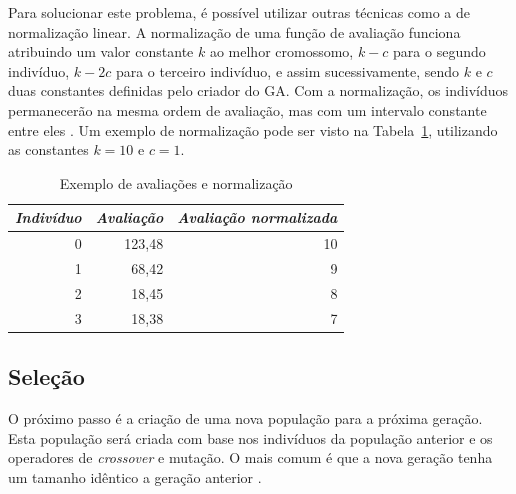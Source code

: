 \documentclass[12pt,oneside,a4paper,english,french,spanish,brazil,]{abntex2}
\begin{document}
Para solucionar este problema, é possível utilizar outras técnicas como a de normalização linear. A normalização de uma função de avaliação funciona atribuindo um valor constante \(k\) ao melhor cromossomo, \(k - c\) para o segundo indivíduo, \(k - 2c\) para o terceiro indivíduo, e assim sucessivamente, sendo \(k\) e \(c\) duas constantes definidas pelo criador do GA. Com a normalização, os indivíduos permanecerão na mesma ordem de avaliação, mas com um intervalo constante entre eles  \cite{linden:2008}. Um exemplo de normalização pode ser visto na Tabela~\ref{tab:Normalizacao_Avaliacao}, utilizando as constantes \(k = 10\) e \(c = 1\).

\begin{table}[tbp]
\centering
\caption{Exemplo de avaliações e normalização}
\label{tab:Normalizacao_Avaliacao}
\begin{tabular}{rrr}
\hline
\multicolumn{1}{l}{\textit{\textbf{Indivíduo}}} & \multicolumn{1}{l}{\textit{\textbf{Avaliação}}} & \multicolumn{1}{l}{\textit{\textbf{Avaliação normalizada}}} \\ \hline
0                                                & 123,48                                           & 10                                                           \\
1                                                & 68,42                                            & 9                                                            \\
2                                                & 18,45                                            & 8                                                            \\
3                                                & 18,38                                            & 7    \\ \hline                                                       
\end{tabular}
\end{table}

\subsection{Seleção}

O próximo passo é a criação de uma nova população para a próxima geração. Esta população será criada com base nos indivíduos da população anterior e os operadores de \textit{crossover} e mutação. O mais comum é que a nova geração tenha um tamanho idêntico a geração anterior \cite{linden:2008}.
\end{document}
